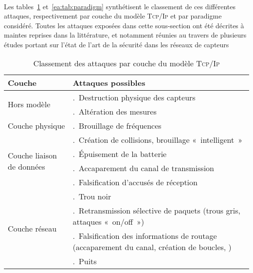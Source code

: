         \paragraph{}
Les tables~\ref{ea:tab:layer} et~\ref{ea:tab:paradigm} synthétisent le classement de ces différentes attaques, respectivement par couche du modèle \textsc{Tcp/Ip} et par paradigme considéré.
Toutes les attaques exposées dans cette sous-section ont été décrites à maintes reprises dans la littérature, et notamment réunies au travers de plusieurs études portant sur l'état de l'art de la sécurité dans les réseaux de capteurs~\cite{SSS11,RM11,AD14}
\begin{table}[!ht]
    \setcounter{LayerNumber}{1}
    \newcommand\num[1]{\theLayerNumber.~#1\stepcounter{LayerNumber}}
    \caption{Classement des attaques par couche du modèle \textsc{Tcp/Ip}}\label{ea:tab:layer}
    \centering
    \medskip
    \begin{small}
        \begin{tabular}{m{}|p{}}
            \toprule
            \textbf{Couche} & \textbf{Attaques possibles}\\
            \midrule
            \multirow{2}{*}{Hors modèle}%
                & \num{Destruction physique des capteurs}\\
                & \num{Altération des mesures}\\
            \midrule
            \multirow{1}{*}{Couche physique}%
                & \num{Brouillage de fréquences}\\
            \midrule
            \multirow{4}{*}{\parbox{.2\textwidth}{Couche liaison de données}}%
                & \num{Création de collisions, brouillage « intelligent »}\\
                & \num{Épuisement de la batterie}\\
                & \num{Accaparement du canal de transmission}\\
                & \num{Falsification d'accusés de réception}\\
            \midrule
            \multirow{8}{*}{Couche réseau}%
                & \num{Trou noir}\\
                & \num{Retransmission sélective de paquets (trous gris, attaques « on/off »)}\\
                & \num{Falsification des informations de routage (accaparement du canal, création de boucles, \etc)}\\
                & \num{Puits}\\

\end{tabular}
\end{small}
\end{table}
